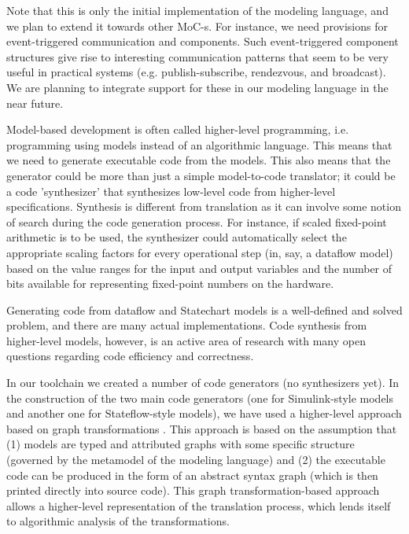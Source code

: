 Note that this is only the initial implementation of the modeling language, and we plan to extend it towards other MoC-s. For instance, we need provisions for event-triggered communication and components. Such event-triggered component structures give rise to interesting communication patterns that seem to be very useful in practical systems (e.g. publish-subscribe, rendezvous, and broadcast). We are planning to integrate support for these in our modeling language in the near future.

Model-based development is often called higher-level programming, i.e. programming using models instead of an algorithmic language. This means that we need to generate executable code from the models. This also means that the generator could be more than just a simple model-to-code translator; it could be a code 'synthesizer' that synthesizes low-level code from higher-level specifications. Synthesis is different from translation as it can involve some notion of search during the code generation process. For instance, if scaled fixed-point arithmetic is to be used, the synthesizer could automatically select the appropriate scaling factors for every operational step (in, say, a dataflow model) based on the value ranges for the input and output variables and the number of bits available for representing fixed-point numbers on the hardware.

Generating code from dataflow and Statechart models is a well-defined and solved problem, and there are many actual implementations. Code synthesis from higher-level models, however, is an active area of research with many open questions regarding code efficiency and correctness.

In our toolchain we created a number of code generators (no synthesizers yet). In the construction of the two main code generators (one for Simulink-style models and another one for Stateflow-style models), we have used a higher-level approach based on graph transformations \cite{isis:great}. This approach is based on the assumption that (1) models are typed and attributed graphs with some specific structure (governed by the metamodel of the modeling language) and (2) the executable code can be produced in the form of an abstract syntax graph (which is then printed directly into source code). This graph transformation-based approach allows a higher-level representation of the translation process, which lends itself to algorithmic analysis of the transformations.

